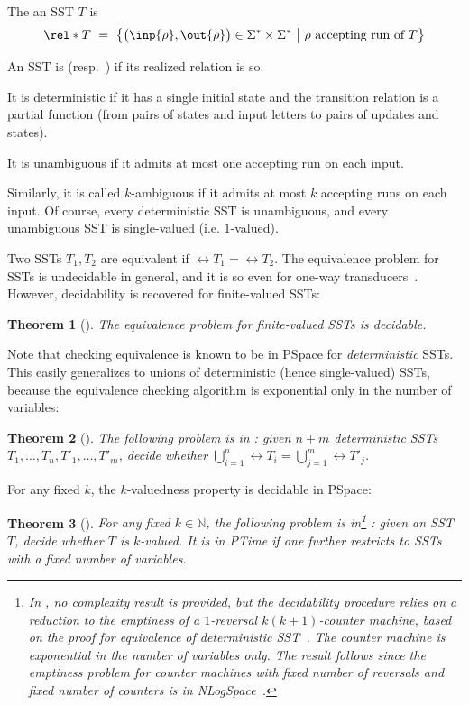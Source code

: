 \documentclass{article}
\newtheorem{theorem}{Theorem}\newtheorem{lemma}[theorem]{Lemma}\newtheorem{proposition}[theorem]{Proposition}\newtheorem{corollary}[theorem]{Corollary}\newtheorem{definition}[theorem]{Definition}\newtheorem{claim}[theorem]{Claim}\newtheorem{remark}[theorem]{Remark}\newtheorem{example}[theorem]{Example}\newtheorem*{claim*}{Claim}
\providecommand{\AP}{}\NewDocumentCommand{\reintro}{o m}{#2}
\newcommand{\sst}{T}
\newcommand{\alp}{\Sigma}
\begin{document}
\AP
The  an SST $T$ is 
\[
  \rel*{T}
  ~=~ 
  \big\{ \big(\inp{\rho},\out{\rho}\big)\in \alp^*\times \alp^* ~\big|~
         \rho\text{ accepting run of }T \big\}
\]
\AP
An SST is  (resp.~) 
if its realized relation is so.
\AP
It is deterministic 
if it has a single
initial state and the transition relation is a partial function 
(from pairs of states and input letters to pairs of updates and states).
\AP
It is unambiguous if it admits at most one accepting run on each input.
\AP
Similarly, it is called $k$-ambiguous if it admits at most 
$k$ accepting runs on each input. 
Of course, every deterministic SST is unambiguous, and every
unambiguous SST is single-valued (i.e. $1$-valued).
\AP
Two SSTs $\sst_1,\sst_2$ are equivalent 
if $\rel{\sst_1}=\rel{\sst_2}$. 
The equivalence problem for SSTs is undecidable in
general, and it is so even for one-way transducers~\cite{FischerR68,iba78siam}. 
However, decidability is recovered for finite-valued SSTs:

\begin{theorem}[\cite{equivalence-finite-valued}]
The equivalence problem for finite-valued SSTs is decidable.
\end{theorem}


Note that checking equivalence is known to be in 
{\upshape\sc PSpace} for \emph{deterministic} SSTs.
This easily generalizes to 
unions of deterministic (hence single-valued) SSTs, because the
equivalence checking algorithm is exponential only in the number of variables: 

\begin{theorem}[\cite{DBLP:conf/icalp/AlurD11}]
The following problem is in : 
given $n+m$ deterministic SSTs $\sst_1,\dots,\sst_n,\sst'_1,\dots,\sst'_m$, 
decide whether $\bigcup_{i=1}^n\rel{\sst_i} = \bigcup_{j=1}^m\rel{\sst'_j}$.
\end{theorem}

For any fixed $k$, the $k$-valuedness property is 
decidable in {\upshape\sc PSpace}:

\begin{theorem}[\cite{DBLP:conf/icalp/AlurD11}]
For any fixed $k\in\mathbb{N}$, the following problem 
is in\footnote{In
  \cite{DBLP:conf/icalp/AlurD11}, no complexity result is provided,
  but the decidability procedure relies on a reduction to the
  emptiness of a $1$-reversal $k(k+1)$-counter machine, based on the
  proof for equivalence of deterministic
SST~\cite{DBLP:conf/popl/AlurC11}. The counter machine is 
exponential in the number of variables only. The result follows since the
emptiness problem for counter machines with fixed number of reversals and fixed
number of counters is in
{\upshape\sc NLogSpace}~\cite{DBLP:journals/jcss/GurariI81}.} : 
given an SST $T$, decide whether $T$ is $k$-valued.
It is in {\upshape\sc PTime} if one further restricts to SSTs
with a fixed number of variables.
\end{theorem}
\end{document}
